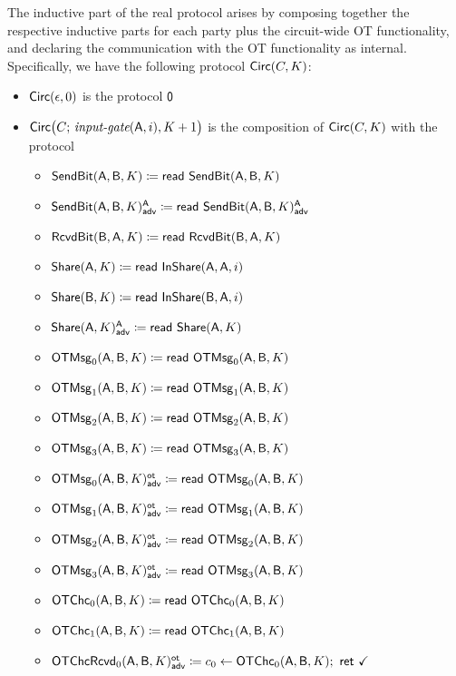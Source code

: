 \noindent The inductive part of the real protocol arises by composing together the respective inductive parts for each party plus the circuit-wide OT functionality, and declaring the communication with the OT functionality as internal. Specifically, we have the following protocol $\Circ(C,K)$:

\begin{itemize}
\item $\Circ(\epsilon,0)$ is the protocol $\zero$

\item $\Circ\big(C; \, \inputgate(\A,i),K+1\big)$ is the composition of $\Circ(C,K)$ with the protocol
\begin{itemize}
\item $\SendBit(\A,\B,K) \coloneqq \read{\SendBit(\A,\B,K)}$
\item {\color{blue} $\LeakSendBit(\A,\B,K)^\A_\adv \coloneqq \read{\LeakSendBit(\A,\B,K)^\A_\adv}$}\smallskip
\item $\RcvdBit(\B,\A,K) \coloneqq \read{\RcvdBit(\B,\A,K)}$\smallskip
\item $\Share(\A,K) \coloneqq \read{\InShare(\A,\A,i)}$
\item $\Share(\B,K) \coloneqq \read{\InShare(\B,\A,i)}$
\item {\color{blue} $\LeakShare(\A,K)^\A_\adv \coloneqq \read{\Share(\A,K)}$}\smallskip
\item $\OTMsg_0(\A,\B,K) \coloneqq \read{\OTMsg_0(\A,\B,K)}$
\item $\OTMsg_1(\A,\B,K) \coloneqq \read{\OTMsg_1(\A,\B,K)}$
\item $\OTMsg_2(\A,\B,K) \coloneqq \read{\OTMsg_2(\A,\B,K)}$
\item $\OTMsg_3(\A,\B,K) \coloneqq \read{\OTMsg_3(\A,\B,K)}$\smallskip
\item {\color{blue} $\LeakOTMsg_0(\A,\B,K)^\ot_\adv \coloneqq \read{\OTMsg_0(\A,\B,K)}$}
\item {\color{blue} $\LeakOTMsg_1(\A,\B,K)^\ot_\adv \coloneqq \read{\OTMsg_1(\A,\B,K)}$}
\item {\color{blue} $\LeakOTMsg_2(\A,\B,K)^\ot_\adv \coloneqq \read{\OTMsg_2(\A,\B,K)}$}
\item {\color{blue} $\LeakOTMsg_3(\A,\B,K)^\ot_\adv \coloneqq \read{\OTMsg_3(\A,\B,K)}$}\smallskip
\item $\OTChc_0(\A,\B,K) \coloneqq \read{\OTChc_0(\A,\B,K)}$
\item $\OTChc_1(\A,\B,K) \coloneqq \read{\OTChc_1(\A,\B,K)}$\smallskip
\item {\color{blue} $\LeakOTChcRcvd_0(\A,\B,K)^\ot_\adv \coloneqq c_0 \leftarrow \OTChc_0(\A,\B,K); \ \ret{\checkmark}$}

\end{itemize}
\end{itemize}
